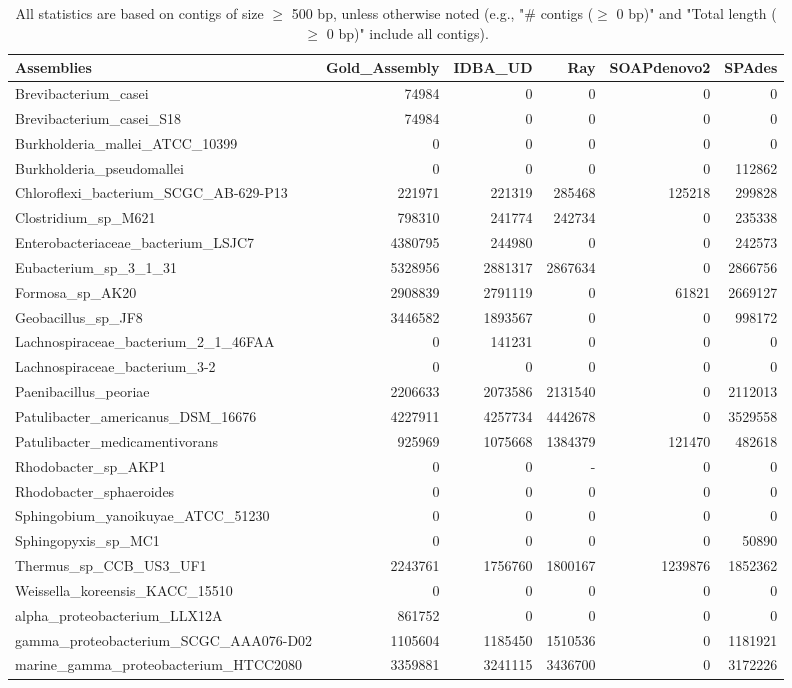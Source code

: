 \documentclass[12pt,a4paper]{article}
\begin{document}
\begin{table}[ht]
\begin{center}
\caption{All statistics are based on contigs of size $\geq$ 500 bp, unless otherwise noted (e.g., "\# contigs ($\geq$ 0 bp)" and "Total length ($\geq$ 0 bp)" include all contigs).}
\begin{tabular}{|l*{5}{|r}|}
\hline
Assemblies & Gold\_Assembly & IDBA\_UD & Ray & SOAPdenovo2 & SPAdes \\ \hline
Brevibacterium\_casei & 74984 & 0 & 0 & 0 & 0 \\ \hline
Brevibacterium\_casei\_S18 & 74984 & 0 & 0 & 0 & 0 \\ \hline
Burkholderia\_mallei\_ATCC\_10399 & 0 & 0 & 0 & 0 & 0 \\ \hline
Burkholderia\_pseudomallei & 0 & 0 & 0 & 0 & 112862 \\ \hline
Chloroflexi\_bacterium\_SCGC\_AB-629-P13 & 221971 & 221319 & 285468 & 125218 & 299828 \\ \hline
Clostridium\_sp\_M621 & 798310 & 241774 & 242734 & 0 & 235338 \\ \hline
Enterobacteriaceae\_bacterium\_LSJC7 & 4380795 & 244980 & 0 & 0 & 242573 \\ \hline
Eubacterium\_sp\_3\_1\_31 & 5328956 & 2881317 & 2867634 & 0 & 2866756 \\ \hline
Formosa\_sp\_AK20 & 2908839 & 2791119 & 0 & 61821 & 2669127 \\ \hline
Geobacillus\_sp\_JF8 & 3446582 & 1893567 & 0 & 0 & 998172 \\ \hline
Lachnospiraceae\_bacterium\_2\_1\_46FAA & 0 & 141231 & 0 & 0 & 0 \\ \hline
Lachnospiraceae\_bacterium\_3-2 & 0 & 0 & 0 & 0 & 0 \\ \hline
Paenibacillus\_peoriae & 2206633 & 2073586 & 2131540 & 0 & 2112013 \\ \hline
Patulibacter\_americanus\_DSM\_16676 & 4227911 & 4257734 & 4442678 & 0 & 3529558 \\ \hline
Patulibacter\_medicamentivorans & 925969 & 1075668 & 1384379 & 121470 & 482618 \\ \hline
Rhodobacter\_sp\_AKP1 & 0 & 0 & - & 0 & 0 \\ \hline
Rhodobacter\_sphaeroides & 0 & 0 & 0 & 0 & 0 \\ \hline
Sphingobium\_yanoikuyae\_ATCC\_51230 & 0 & 0 & 0 & 0 & 0 \\ \hline
Sphingopyxis\_sp\_MC1 & 0 & 0 & 0 & 0 & 50890 \\ \hline
Thermus\_sp\_CCB\_US3\_UF1 & 2243761 & 1756760 & 1800167 & 1239876 & 1852362 \\ \hline
Weissella\_koreensis\_KACC\_15510 & 0 & 0 & 0 & 0 & 0 \\ \hline
alpha\_proteobacterium\_LLX12A & 861752 & 0 & 0 & 0 & 0 \\ \hline
gamma\_proteobacterium\_SCGC\_AAA076-D02 & 1105604 & 1185450 & 1510536 & 0 & 1181921 \\ \hline
marine\_gamma\_proteobacterium\_HTCC2080 & 3359881 & 3241115 & 3436700 & 0 & 3172226 \\ \hline
\end{tabular}
\end{center}
\end{table}
\end{document}
